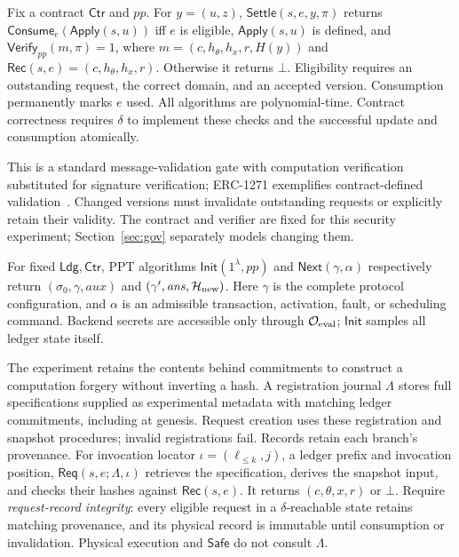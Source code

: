 \documentclass[runningheads,orivec]{llncs}
\newcommand{\Verify}{\mathsf{Verify}}
\newcommand{\Rec}{\mathsf{Rec}}
\newcommand{\Req}{\mathsf{Req}}
\newcommand{\Init}{\mathsf{Init}}
\newcommand{\Next}{\mathsf{Next}}
\newcommand{\Safe}{\mathsf{Safe}}
\newcommand{\Apply}{\mathsf{Apply}}
\newcommand{\Consume}{\mathsf{Consume}}
\newcommand{\Settle}{\mathsf{Settle}}
\newcommand{\Ldg}{\mathsf{Ldg}}
\newcommand{\Ctr}{\mathsf{Ctr}}
\newcommand{\EvalO}{\mathcal O_{\rm eval}}
\begin{document}
\begin{definition}\label{def:contract}
Fix a contract $\Ctr$ and $pp$. For $y=(u,z)$, $\Settle(s,e,y,\pi)$ returns $\Consume_e(\Apply(s,u))$ iff $e$ is eligible, $\Apply(s,u)$ is defined, and $\Verify_{pp}(m,\pi)=1$, where $m=(c,h_\theta,h_x,r,H(y))$ and $\Rec(s,e)=(c,h_\theta,h_x,r)$. Otherwise it returns $\bot$. Eligibility requires an outstanding request, the correct domain, and an accepted version. Consumption permanently marks $e$ used. All algorithms are polynomial-time. Contract correctness requires $\delta$ to implement these checks and the successful update and consumption atomically.
\end{definition}
This is a standard message-validation gate with computation verification substituted for signature verification; ERC-1271 exemplifies contract-defined validation~\cite{erc1271}. Changed versions must invalidate outstanding requests or explicitly retain their validity. The contract and verifier are fixed for this security experiment; Section~\ref{sec:gov} separately models changing them.

For fixed $\Ldg,\Ctr$, PPT algorithms $\Init(1^\lambda,pp)$ and $\Next(\gamma,\alpha)$ respectively return $(\sigma_0,\gamma,\mathit{aux})$ and $(\gamma',\mathit{ans},\mathcal H_{\rm new})$. Here $\gamma$ is the complete protocol configuration, and $\alpha$ is an admissible transaction, activation, fault, or scheduling command. Backend secrets are accessible only through $\EvalO$; $\Init$ samples all ledger state itself.

The experiment retains the contents behind commitments to construct a computation forgery without inverting a hash. A registration journal $\Lambda$ stores full specifications supplied as experimental metadata with matching ledger commitments, including at genesis. Request creation uses these registration and snapshot procedures; invalid registrations fail. Records retain each branch's provenance. For invocation locator $\iota=(\ell_{\leq k},j)$, a ledger prefix and invocation position, $\Req(s,e;\Lambda,\iota)$ retrieves the specification, derives the snapshot input, and checks their hashes against $\Rec(s,e)$. It returns $(c,\theta,x,r)$ or $\bot$. Require \emph{request-record integrity}: every eligible request in a $\delta$-reachable state retains matching provenance, and its physical record is immutable until consumption or invalidation. Physical execution and $\Safe$ do not consult $\Lambda$.
\end{document}
